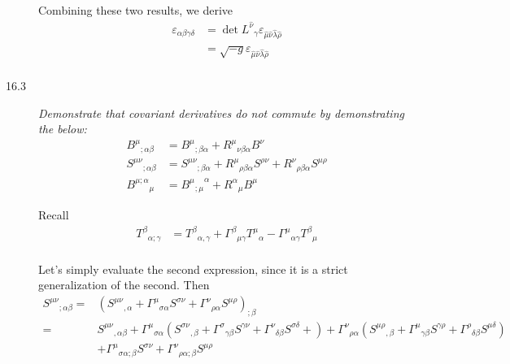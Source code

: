 \documentclass[12pt]{report}
\begin{document}
\begin{description}
        Combining these two results, we derive
        \begin{align*}
            \varepsilon_{\alpha\beta\gamma\delta} &=
                \det {L^{\hat{\nu}}}_{\gamma}
                \varepsilon_{\hat{\mu}\hat{\nu}\hat{\lambda}\hat{\rho}}\\
                &= \sqrt{-g}
                \varepsilon_{\hat{\mu}\hat{\nu}\hat{\lambda}\hat{\rho}}\\
        \end{align*}

    \item[16.3] \emph{Demonstrate that covariant derivatives do not commute by
        demonstrating the below:}
        \begin{align*}
            {B^\mu}_{;\alpha\beta} &= {B^\mu}_{;\beta\alpha} +
                {R^\mu}_{\nu\beta\alpha} B^\nu\\
            {S^{\mu\nu}}_{;\alpha\beta} &= {S^{\mu\nu}}_{;\beta\alpha} +
                {R^\mu}_{\rho\beta\alpha}S^{\rho\nu} +
                {R^\nu}_{\rho\beta\alpha}S^{\mu\rho}\\
            {B^{\mu;\alpha}}_\mu &= {{B^\mu}_{;\mu}}^\alpha +
                {R^\alpha}_\mu B^\mu
        \end{align*}

        Recall
        \begin{align*}
            {T^{\beta}}_{\alpha;\gamma} &=
                {T^\beta}_{\alpha,\gamma} +
                {\Gamma^\beta}_{\mu\gamma}{T^{\mu}}_\alpha -
                {\Gamma^\mu}_{\alpha\gamma}{T^{\beta}}_\mu\\
        \end{align*}

        Let's simply evaluate the second expression, since it is a strict
        generalization of the second. Then
        \begin{align*}
            {S^{\mu\nu}}_{;\alpha\beta} {}=& \left(
                {S^{\mu\nu}}_{,\alpha} +
                {\Gamma^\mu}_{\sigma\alpha}S^{\sigma\nu} +
                {\Gamma^\nu}_{\rho\alpha}S^{\mu\rho}
            \right)_{;\beta}\\
            {}=& {S^{\mu\nu}}_{,\alpha\beta} +
            {\Gamma^\mu}_{\sigma\alpha}\left(
                {S^{\sigma\nu}}_{,\beta} +
                {\Gamma^\sigma}_{\gamma\beta}S^{\gamma\nu} +
                {\Gamma^\nu}_{\delta\beta}S^{\sigma\delta} +
            \right) +
            {\Gamma^\nu}_{\rho\alpha}\left(
                {S^{\mu\rho}}_{,\beta} +
                {\Gamma^\mu}_{\gamma\beta}S^{\gamma\rho} +
                {\Gamma^\rho}_{\delta\beta}S^{\mu\delta}
            \right)\\
            &+ {\Gamma^\mu}_{\sigma\alpha;\beta}S^{\sigma\nu} +
                {\Gamma^\nu}_{\rho\alpha;\beta}S^{\mu\rho}
        \end{align*}


\end{description}
\end{document}
